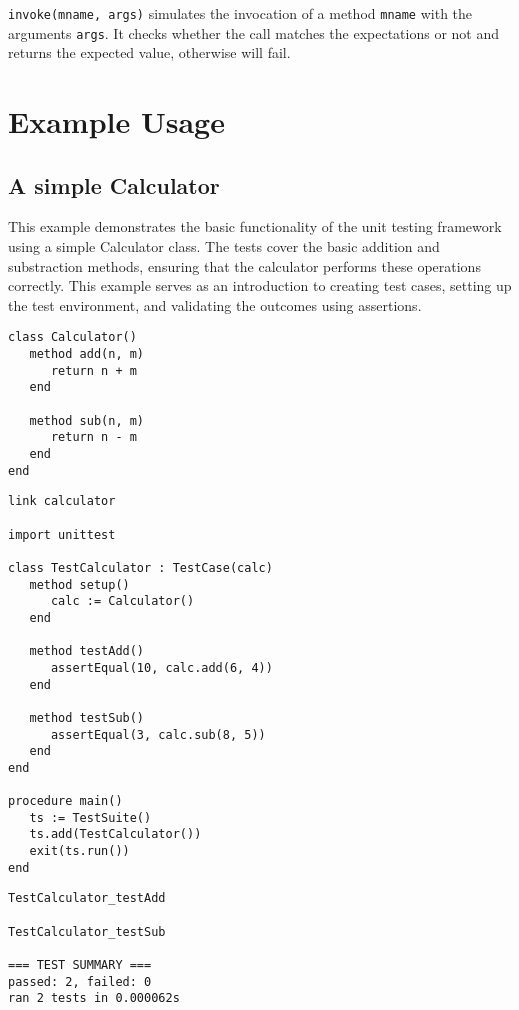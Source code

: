 \documentclass[letterpaper,12pt]{article}
\begin{document}
\vspace{0.1cm}
\noindent
\texttt{invoke(mname, args)} simulates the invocation of a method \texttt{mname} with the arguments \texttt{args}. It checks whether the call matches the expectations or not and returns the expected value, otherwise will fail.

\newpage\section{Example Usage}

\subsection{A simple Calculator}

This example demonstrates the basic functionality of the unit testing framework using a simple Calculator class. The tests cover the basic addition and substraction methods, ensuring that the calculator performs these operations correctly. This example serves as an introduction to creating test cases, setting up the test environment, and validating the outcomes using assertions.

\bigskip{}
\begin{verbatim}
class Calculator()
   method add(n, m)
      return n + m
   end

   method sub(n, m)
      return n - m
   end
end
\end{verbatim}

\bigskip {}
\begin{verbatim}
link calculator

import unittest

class TestCalculator : TestCase(calc)
   method setup()
      calc := Calculator()
   end

   method testAdd()
      assertEqual(10, calc.add(6, 4))
   end

   method testSub()
      assertEqual(3, calc.sub(8, 5))
   end
end

procedure main()
   ts := TestSuite()
   ts.add(TestCalculator())
   exit(ts.run())
end
\end{verbatim}

\bigskip{}
\begin{verbatim}
TestCalculator_testAdd

TestCalculator_testSub

=== TEST SUMMARY ===
passed: 2, failed: 0
ran 2 tests in 0.000062s
\end{verbatim}
\end{document}
